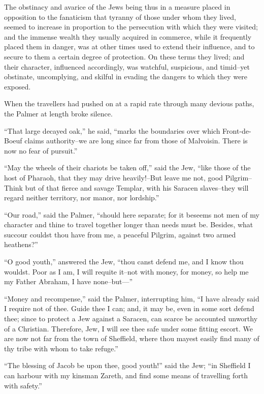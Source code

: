 The obstinacy and avarice of the Jews being thus in a measure placed in
opposition to the fanaticism that tyranny of those under whom they
lived, seemed to increase in proportion to the persecution with which
they were visited; and the immense wealth they usually acquired in
commerce, while it frequently placed them in danger, was at other times
used to extend their influence, and to secure to them a certain degree
of protection. On these terms they lived; and their character,
influenced accordingly, was watchful, suspicious, and timid--yet
obstinate, uncomplying, and skilful in evading the dangers to which they
were exposed.

When the travellers had pushed on at a rapid rate through many devious
paths, the Palmer at length broke silence.

``That large decayed oak,'' he said, ``marks the boundaries over which
Front-de-Boeuf claims authority--we are long since far from those of
Malvoisin. There is now no fear of pursuit.''

``May the wheels of their chariots be taken off,'' said the Jew, ``like
those of the host of Pharaoh, that they may drive heavily!--But leave me
not, good Pilgrim--Think but of that fierce and savage Templar, with his
Saracen slaves--they will regard neither territory, nor manor, nor
lordship.''

``Our road,'' said the Palmer, ``should here separate; for it beseems
not men of my character and thine to travel together longer than needs
must be. Besides, what succour couldst thou have from me, a peaceful
Pilgrim, against two armed heathens?''

``O good youth,'' answered the Jew, ``thou canst defend me, and I know
thou wouldst. Poor as I am, I will requite it--not with money, for
money, so help me my Father Abraham, I have none--but---''

``Money and recompense,'' said the Palmer, interrupting him, ``I have
already said I require not of thee. Guide thee I can; and, it may be,
even in some sort defend thee; since to protect a Jew against a Saracen,
can scarce be accounted unworthy of a Christian. Therefore, Jew, I will
see thee safe under some fitting escort. We are now not far from the
town of Sheffield, where thou mayest easily find many of thy tribe with
whom to take refuge.''

``The blessing of Jacob be upon thee, good youth!'' said the Jew; ``in
Sheffield I can harbour with my kinsman Zareth, and find some means of
travelling forth with safety.''

